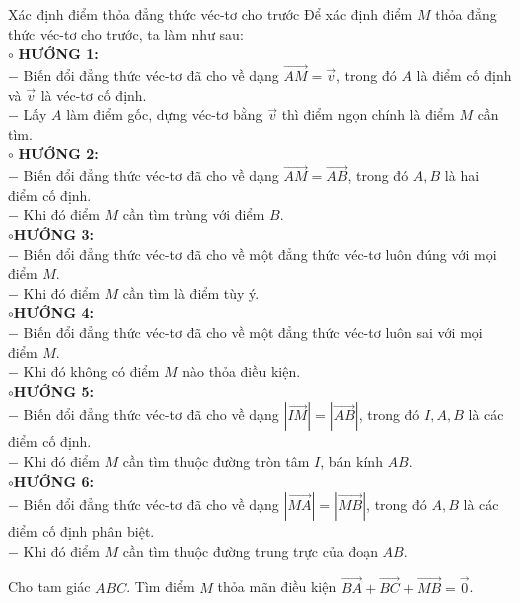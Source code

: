 \begin{dang}{Xác định điểm thỏa đẳng thức véc-tơ cho trước}
	Để xác định điểm $M$ thỏa đẳng thức véc-tơ cho trước, ta làm như sau:
	\\$\circ$ \textbf{HƯỚNG 1:}\\
	$-$  Biến đổi đẳng thức véc-tơ đã cho về dạng $\vec{AM}=\vec{v}$, trong đó $A$ là điểm cố định và $\vec{v}$ là véc-tơ cố định.\\
	$-$  Lấy $A$ làm điểm gốc, dựng véc-tơ bằng $\vec{v}$ thì điểm ngọn chính là điểm $M$ cần tìm.
	\\$\circ$ \textbf{HƯỚNG 2:}\\
	$-$  Biến đổi đẳng thức véc-tơ đã cho về dạng $\vec{AM}=\vec{AB}$, trong đó $A,B$ là hai điểm cố định.\\
	$-$  Khi đó điểm $M$ cần tìm trùng với điểm $B$.
	\\$\circ$\textbf{HƯỚNG 3:}\\
	$-$  Biến đổi đẳng thức véc-tơ đã cho về một đẳng thức véc-tơ luôn đúng với mọi điểm $M$.\\
	$-$  Khi đó điểm $M$ cần tìm là điểm tùy ý.
	\\$\circ$\textbf{HƯỚNG 4:}\\
	$-$  Biến đổi đẳng thức véc-tơ đã cho về một đẳng thức véc-tơ luôn sai với mọi điểm $M$.\\
	$-$  Khi đó không có điểm $M$ nào thỏa điều kiện.
	\\$\circ$\textbf{HƯỚNG 5:}\\
	$-$  Biến đổi đẳng thức véc-tơ đã cho về dạng $\left\vert \vec{IM}\right\vert=\left\vert \vec{AB}\right\vert$, trong đó $I,A,B$ là các điểm cố định.\\
	$-$  Khi đó điểm $M$ cần tìm thuộc đường tròn tâm $I$, bán kính $AB$.
	\\$\circ$\textbf{HƯỚNG 6:}\\
	$-$  Biến đổi đẳng thức véc-tơ đã cho về dạng $\left\vert \vec{MA}\right\vert=\left\vert \vec{MB}\right\vert$, trong đó $A,B$ là các điểm cố định phân biệt.\\
	$-$  Khi đó điểm $M$ cần tìm thuộc đường trung trực của đoạn $AB$.

\end{dang}
%
\begin{vd}%
	Cho tam giác $ABC$. Tìm điểm $M$ thỏa mãn điều kiện $\vec{BA}+\vec{BC}+\vec{MB}=\vec{0}$.
\end{vd}
